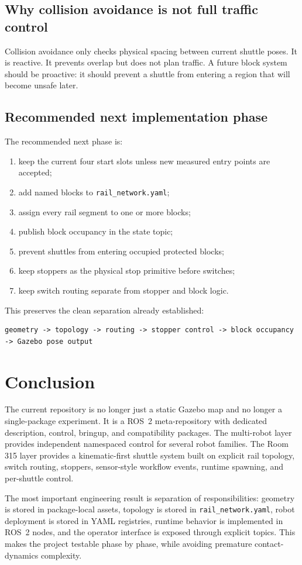 \documentclass[12pt,a4paper]{report}
\begin{document}
\section{Why collision avoidance is not full traffic control}

Collision avoidance only checks physical spacing between current shuttle poses.
It is reactive. It prevents overlap but does not plan traffic. A future block
system should be proactive: it should prevent a shuttle from entering a region
that will become unsafe later.

\section{Recommended next implementation phase}

The recommended next phase is:

\begin{enumerate}
\item keep the current four start slots unless new measured entry points are
accepted;
\item add named blocks to \texttt{rail\_network.yaml};
\item assign every rail segment to one or more blocks;
\item publish block occupancy in the state topic;
\item prevent shuttles from entering occupied protected blocks;
\item keep stoppers as the physical stop primitive before switches;
\item keep switch routing separate from stopper and block logic.
\end{enumerate}

This preserves the clean separation already established:

\begin{lstlisting}[style=terminalcode]
geometry -> topology -> routing -> stopper control -> block occupancy -> Gazebo pose output
\end{lstlisting}

\chapter{Conclusion}

The current repository is no longer just a static Gazebo map and no longer a
single-package experiment. It is a ROS~2 meta-repository with dedicated
description, control, bringup, and compatibility packages. The multi-robot
layer provides independent namespaced control for several robot families. The
Room 315 layer provides a kinematic-first shuttle system built on explicit rail
topology, switch routing, stoppers, sensor-style workflow events, runtime
spawning, and per-shuttle control.

The most important engineering result is separation of responsibilities:
geometry is stored in package-local assets, topology is stored in
\texttt{rail\_network.yaml}, robot deployment is stored in YAML registries,
runtime behavior is implemented in ROS~2 nodes, and the operator interface is
exposed through explicit topics. This makes the project testable phase by
phase, while avoiding premature contact-dynamics complexity.
\end{document}
